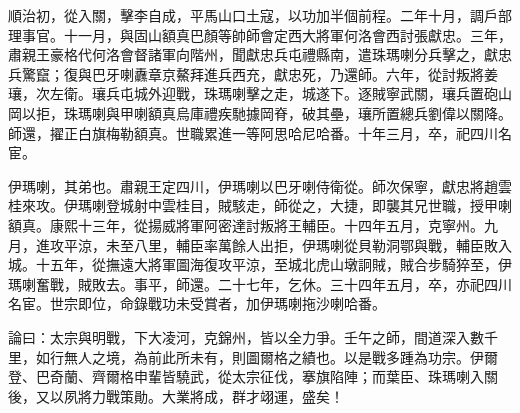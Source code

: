 \begin{pinyinscope}
順治初，從入關，擊李自成，平馬山口土寇，以功加半個前程。二年十月，調戶部理事官。十一月，與固山額真巴顏等帥師會定西大將軍何洛會西討張獻忠。三年，肅親王豪格代何洛會督諸軍向階州，聞獻忠兵屯禮縣南，遣珠瑪喇分兵擊之，獻忠兵驚竄；復與巴牙喇纛章京鰲拜進兵西充，獻忠死，乃還師。六年，從討叛將姜瓖，次左衛。瓖兵屯城外迎戰，珠瑪喇擊之走，城遂下。逐賊寧武關，瓖兵置砲山岡以拒，珠瑪喇與甲喇額真烏庫禮疾馳據岡脊，破其壘，瓖所置總兵劉偉以關降。師還，擢正白旗梅勒額真。世職累進一等阿思哈尼哈番。十年三月，卒，祀四川名宦。

伊瑪喇，其弟也。肅親王定四川，伊瑪喇以巴牙喇侍衛從。師次保寧，獻忠將趙雲桂來攻。伊瑪喇登城射中雲桂目，賊駭走，師從之，大捷，即襲其兄世職，授甲喇額真。康熙十三年，從揚威將軍阿密達討叛將王輔臣。十四年五月，克寧州。九月，進攻平涼，未至八里，輔臣率萬餘人出拒，伊瑪喇從貝勒洞鄂與戰，輔臣敗入城。十五年，從撫遠大將軍圖海復攻平涼，至城北虎山墩詗賊，賊合步騎猝至，伊瑪喇奮戰，賊敗去。事平，師還。二十七年，乞休。三十四年五月，卒，亦祀四川名宦。世宗即位，命錄戰功未受賞者，加伊瑪喇拖沙喇哈番。

論曰：太宗與明戰，下大凌河，克錦州，皆以全力爭。壬午之師，間道深入數千里，如行無人之境，為前此所未有，則圖爾格之績也。以是戰多踵為功宗。伊爾登、巴奇蘭、齊爾格申輩皆驍武，從太宗征伐，搴旗陷陣；而葉臣、珠瑪喇入關後，又以夙將力戰策勛。大業將成，群才翊運，盛矣！


\end{pinyinscope}